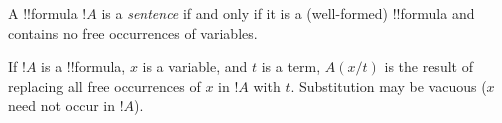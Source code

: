 \documentclass[../../include/open-logic-section]{subfiles}
\begin{document}
\begin{defn}[Sentence]
A !!{formula} $!A$ is a \emph{sentence} if and only if it is a
(well-formed) !!{formula} and contains no free occurrences of variables.
\end{defn}


\begin{defn}
If $!A$ is a !!{formula}, $x$ is a variable, and $t$ is a term, $A(x/t)$
is the result of replacing all free occurrences of $x$ in $!A$ with
$t$. Substitution may be vacuous ($x$ need not occur in $!A$).
\end{defn}
\end{document}
